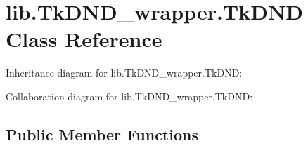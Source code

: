\hypertarget{classlib_1_1_tk_d_n_d__wrapper_1_1_tk_d_n_d}{}\section{lib.\+Tk\+D\+N\+D\+\_\+wrapper.\+Tk\+D\+ND Class Reference}
\label{classlib_1_1_tk_d_n_d__wrapper_1_1_tk_d_n_d}


Inheritance diagram for lib.\+Tk\+D\+N\+D\+\_\+wrapper.\+Tk\+D\+ND\+:


Collaboration diagram for lib.\+Tk\+D\+N\+D\+\_\+wrapper.\+Tk\+D\+ND\+:
\subsection*{Public Member Functions}
